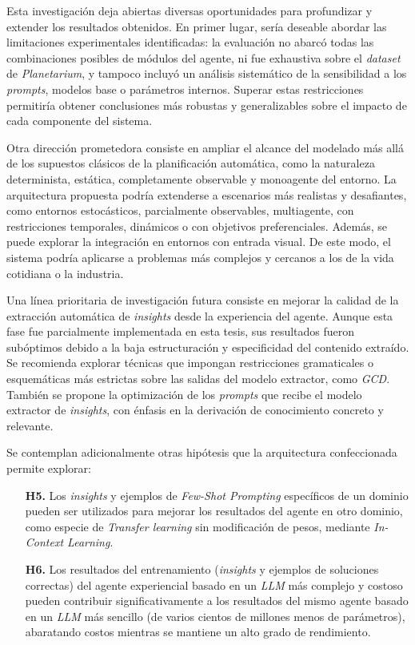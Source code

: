 \begin{recomendations}
Esta investigación deja abiertas diversas oportunidades para profundizar y extender los resultados obtenidos. En primer lugar, sería deseable abordar las limitaciones experimentales identificadas: la evaluación no abarcó todas las combinaciones posibles de módulos del agente, ni fue exhaustiva sobre el \textit{dataset} de \textit{Planetarium}, y tampoco incluyó un análisis sistemático de la sensibilidad a los \textit{prompts}, modelos base o parámetros internos. Superar estas restricciones permitiría obtener conclusiones más robustas y generalizables sobre el impacto de cada componente del sistema.

Otra dirección prometedora consiste en ampliar el alcance del modelado más allá de los supuestos clásicos de la planificación automática, como la naturaleza determinista, estática, completamente observable y monoagente del entorno. La arquitectura propuesta podría extenderse a escenarios más realistas y desafiantes, como entornos estocásticos, parcialmente observables, multiagente, con restricciones temporales, dinámicos o con objetivos preferenciales. Además, se puede explorar la integración en entornos con entrada visual. De este modo, el sistema podría aplicarse a problemas más complejos y cercanos a los de la vida cotidiana o la industria.

Una línea prioritaria de investigación futura consiste en mejorar la calidad de la extracción automática de \textit{insights} desde la experiencia del agente. Aunque esta fase fue parcialmente implementada en esta tesis, sus resultados fueron subóptimos debido a la baja estructuración y especificidad del contenido extraído. Se recomienda explorar técnicas que impongan restricciones gramaticales o esquemáticas más estrictas sobre las salidas del modelo extractor, como \textit{GCD}. También se propone la optimización de los \textit{prompts} que recibe el modelo extractor de \textit{insights}, con énfasis en la derivación de conocimiento concreto y relevante.

Se contemplan adicionalmente otras hipótesis que la arquitectura confeccionada permite explorar:
\begin{itemize}
    \item[\textbf{H5.}] Los \textit{insights} y ejemplos de \textit{Few-Shot Prompting} específicos de un dominio pueden ser utilizados para mejorar los resultados del agente en otro dominio, como especie de \textit{Transfer learning} \parencite{zhuang2020comprehensive} sin modificación de pesos, mediante \textit{In-Context Learning}.
    \item[\textbf{H6.}] Los resultados del entrenamiento (\textit{insights} y ejemplos de soluciones correctas) del agente experiencial basado en un \textit{LLM} más complejo y costoso pueden contribuir significativamente a los resultados del mismo agente basado en un \textit{LLM} más sencillo (de varios cientos de millones menos de parámetros), abaratando costos mientras se mantiene un alto grado de rendimiento.
\end{itemize}


\end{recomendations}

